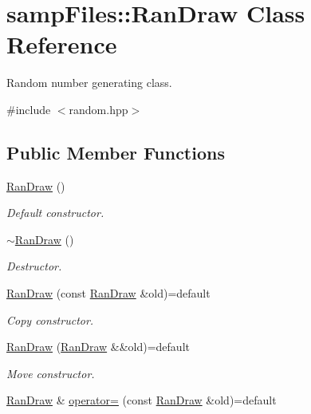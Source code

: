 \hypertarget{classsamp_files_1_1_ran_draw}{}\section{samp\+Files\+:\+:Ran\+Draw Class Reference}
\label{classsamp_files_1_1_ran_draw}


Random number generating class.  




{\ttfamily \#include $<$random.\+hpp$>$}

\subsection*{Public Member Functions}
\begin{DoxyCompactItemize}
\item 
\hyperlink{classsamp_files_1_1_ran_draw_aeda47451836b452b8fc819016242e6e6}{Ran\+Draw} ()
\begin{DoxyCompactList}\small\item\em Default constructor. \end{DoxyCompactList}\item 
\mbox{\label{classsamp_files_1_1_ran_draw_a14c993067e4a8856ba54489eb5f631dd}} 
\hyperlink{classsamp_files_1_1_ran_draw_a14c993067e4a8856ba54489eb5f631dd}{$\sim$\+Ran\+Draw} ()
\begin{DoxyCompactList}\small\item\em Destructor. \end{DoxyCompactList}\item 
\hyperlink{classsamp_files_1_1_ran_draw_aaf6e8bd21e654a9c53b024b36f83149f}{Ran\+Draw} (const \hyperlink{classsamp_files_1_1_ran_draw}{Ran\+Draw} \&old)=default
\begin{DoxyCompactList}\small\item\em Copy constructor. \end{DoxyCompactList}\item 
\hyperlink{classsamp_files_1_1_ran_draw_a9d840323058ba8db43a775a97254b640}{Ran\+Draw} (\hyperlink{classsamp_files_1_1_ran_draw}{Ran\+Draw} \&\&old)=default
\begin{DoxyCompactList}\small\item\em Move constructor. \end{DoxyCompactList}\item 
\hyperlink{classsamp_files_1_1_ran_draw}{Ran\+Draw} \& \hyperlink{classsamp_files_1_1_ran_draw_a6cdfbab1e544fdb15fca3ee4a25d4020}{operator=} (const \hyperlink{classsamp_files_1_1_ran_draw}{Ran\+Draw} \&old)=default

\end{DoxyCompactItemize}

